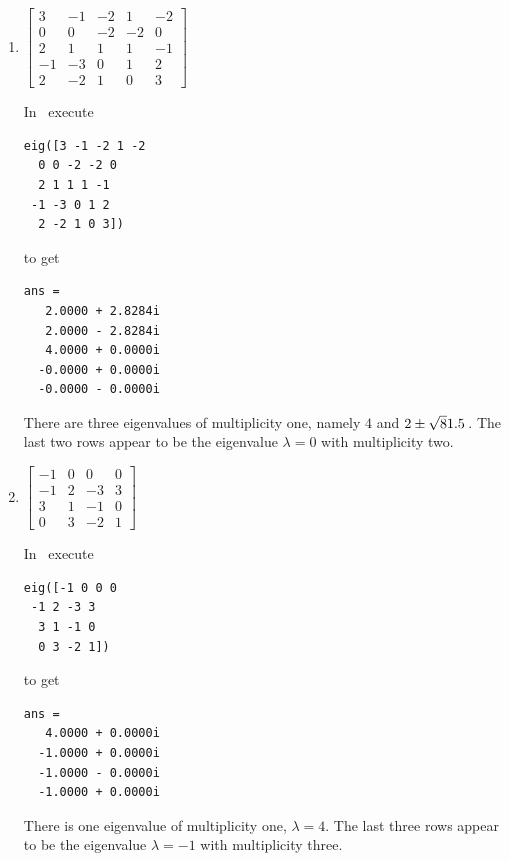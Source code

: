 \begin{example}
\begin{enumerate}
\item \(\begin{bmatrix}3&-1&-2&1&-2
\\0&0&-2&-2&0
\\2&1&1&1&-1
\\-1&-3&0&1&2
\\2&-2&1&0&3\end{bmatrix}\)
\begin{solution} 
In \script\ execute
\begin{verbatim}
eig([3 -1 -2 1 -2
  0 0 -2 -2 0
  2 1 1 1 -1
 -1 -3 0 1 2
  2 -2 1 0 3])
\end{verbatim}
\setbox\ajrqrbox\hbox{}%
\marginpar{\usebox{\ajrqrbox}}%
to get
\begin{verbatim}
ans =
   2.0000 + 2.8284i
   2.0000 - 2.8284i
   4.0000 + 0.0000i
  -0.0000 + 0.0000i
  -0.0000 - 0.0000i
\end{verbatim}
There are three eigenvalues of multiplicity one, namely \(4\) and \(2\pm\sqrt81.5\)\,.  
The last two rows appear to be the eigenvalue \(\lambda=0\) with multiplicity two.
\end{solution}

\item \(\begin{bmatrix}-1&0&0&0
\\-1&2&-3&3
\\3&1&-1&0
\\0&3&-2&1\end{bmatrix}\)
\begin{solution} 
In \script\ execute
\begin{verbatim}
eig([-1 0 0 0
 -1 2 -3 3
  3 1 -1 0
  0 3 -2 1])
\end{verbatim}
\setbox\ajrqrbox\hbox{}%
\marginpar{\usebox{\ajrqrbox}}%
to get
\begin{verbatim}
ans =
   4.0000 + 0.0000i
  -1.0000 + 0.0000i
  -1.0000 - 0.0000i
  -1.0000 + 0.0000i
\end{verbatim}
There is one eigenvalue of multiplicity one, \(\lambda=4\).  
The last three rows appear to be the eigenvalue \(\lambda=-1\) with multiplicity three.
\end{solution}

\end{enumerate}
\end{example}





